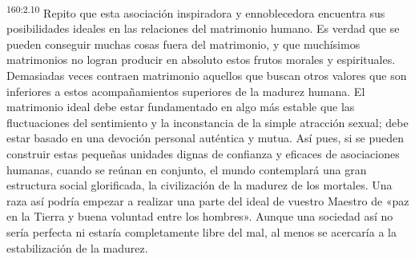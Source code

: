 \par 
\textsuperscript{160:2.10} Repito que esta asociación inspiradora y ennoblecedora encuentra sus posibilidades ideales en las relaciones del matrimonio humano. Es verdad que se pueden conseguir muchas cosas fuera del matrimonio, y que muchísimos matrimonios no logran producir en absoluto estos frutos morales y espirituales. Demasiadas veces contraen matrimonio aquellos que buscan otros valores que son inferiores a estos acompañamientos superiores de la madurez humana. El matrimonio ideal debe estar fundamentado en algo más estable que las fluctuaciones del sentimiento y la inconstancia de la simple atracción sexual; debe estar basado en una devoción personal auténtica y mutua. Así pues, si se pueden construir estas pequeñas unidades dignas de confianza y eficaces de asociaciones humanas, cuando se reúnan en conjunto, el mundo contemplará una gran estructura social glorificada, la civilización de la madurez de los mortales. Una raza así podría empezar a realizar una parte del ideal de vuestro Maestro de «paz en la Tierra y buena voluntad entre los hombres». Aunque una sociedad así no sería perfecta ni estaría completamente libre del mal, al menos se acercaría a la estabilización de la madurez.

